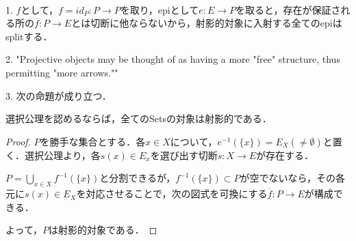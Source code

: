 \documentclass[uplatex, 12pt, dvipdfmx]{jsarticle}
\begin{document}
\begin{remark*}　
    
    1. $f$として，$f=id_P:P\to P$を取り，epiとして$e:E\to P$を取ると，存在が保証される所の$\overline{f}:P\to E$とは切断に他ならないから，射影的対象に入射する全てのepiはsplitする．
    \begin{center}
    \end{center}

    \vspace{1cm}

    2. "Projective objects may be thought of as having a more "free" structure, thus permitting "more arrows.""
    
    \vspace{1cm}

    3. 次の命題が成り立つ．
    \begin{proposition*}
        選択公理を認めるならば，全てのSetsの対象は射影的である．
    \end{proposition*}
    \begin{proof}
        $P$を勝手な集合とする．各$x\in X$について，$e^{-1}(\{x\})=E_X(\ne\emptyset)$と置く．選択公理より，各$s(x)\in E_x$を選び出す切断$s:X\to E$が存在する．

        $P=\bigcup_{x\in X}f^{-1}(\{x\})$と分割できるが，$f^{-1}(\{x\})\subset P$が空でないなら，その各元に$s(x)\in E_X$を対応させることで，次の図式を可換にする$\overline{f}:P\to E$が構成できる．
        \begin{center}
        \end{center}
        よって，$P$は射影的対象である．
    \end{proof}

    \vspace{3cm}


\end{remark*}
\end{document}

